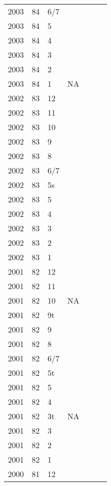 \begin{longtable}{ |l|l|l|l|p{2.7cm}|l|p{2cm}| }
 2003 & 84 &   6/7 &         &  &  & \\
 2003 & 84 &     5 &         &  &  & \\
 2003 & 84 &     4 &         &  &  & \\
 2003 & 84 &     3 &         &  &  & \\
 2003 & 84 &     2 &         &  &  & \\
 2003 & 84 &     1 &     NA  &  &  & \\
 2002 & 83 &    12 &         &  &  & \\
 2002 & 83 &    11 &         &  &  & \\
 2002 & 83 &    10 &         &  &  & \\
 2002 & 83 &     9 &         &  &  & \\
 2002 & 83 &     8 &         &  &  & \\
 2002 & 83 &   6/7 &         &  &  & \\
 2002 & 83 &    5s &         &  &  & \\
 2002 & 83 &     5 &         &  &  & \\
 2002 & 83 &     4 &         &  &  & \\
 2002 & 83 &     3 &         &  &  & \\
 2002 & 83 &     2 &         &  &  & \\
 2002 & 83 &     1 &         &  &  & \\
 2001 & 82 &    12 &         &  &  & \\
 2001 & 82 &    11 &         &  &  & \\
 2001 & 82 &    10 &      NA &  &  & \\
 2001 & 82 &    9t &         &  &  & \\
 2001 & 82 &     9 &         &  &  & \\
 2001 & 82 &     8 &         &  &  & \\
 2001 & 82 &   6/7 &         &  &  & \\
 2001 & 82 &    5t &         &  &  & \\
 2001 & 82 &     5 &         &  &  & \\
 2001 & 82 &     4 &         &  &  & \\
 2001 & 82 &    3t &     NA  &  &  & \\
 2001 & 82 &     3 &         &  &  & \\
 2001 & 82 &     2 &         &  &  & \\
 2001 & 82 &     1 &         &  &  & \\
 2000 & 81 &    12 &         &  &  & \\

\end{longtable}
